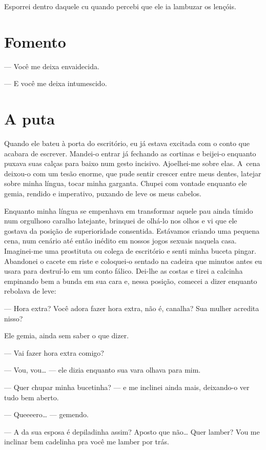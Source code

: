 Esporrei dentro daquele cu quando percebi que ele ia lambuzar os
lençóis.

\chapter{Fomento}

\mbox{}\indent{}--- Você me deixa envaidecida.

--- E você me deixa intumescido.

\chapter{A puta}

Quando ele bateu à porta do escritório, eu já estava excitada com o
conto que acabara de escrever. Mandei-o entrar já fechando as cortinas e
beijei-o enquanto puxava suas calças para baixo num gesto incisivo.
Ajoelhei-me sobre elas. A~cena deixou-o com um tesão enorme, que pude
sentir crescer entre meus dentes, latejar sobre minha língua, tocar
minha garganta. Chupei com vontade enquanto ele gemia, rendido e
imperativo, puxando de leve os meus cabelos.

Enquanto minha língua se empenhava em transformar aquele pau ainda
tímido num orgulhoso caralho latejante, brinquei de olhá-lo nos olhos e
vi que ele gostava da posição de superioridade consentida. Estávamos
criando uma pequena cena, num cenário até então inédito em nossos jogos
sexuais naquela casa. Imaginei-me uma prostituta ou colega de escritório
e senti minha buceta pingar. Abandonei o cacete em riste e coloquei-o
sentado na cadeira que minutos antes eu usara para destruí-lo em um
conto fálico. Dei-lhe as costas e tirei a calcinha empinando bem a bunda
em sua cara e, nessa posição, comecei a dizer enquanto rebolava de leve:

--- Hora extra? Você adora fazer hora extra, não é, canalha? Sua mulher
acredita nisso?

Ele gemia, ainda sem saber o que dizer.

--- Vai fazer hora extra comigo?

--- Vou, vou… --- ele dizia enquanto sua vara olhava para mim.

--- Quer chupar minha bucetinha? --- e me inclinei ainda mais,
deixando-o ver tudo bem aberto.

--- Queeeero… --- gemendo.

--- A da sua esposa é depiladinha assim? Aposto que não… Quer
lamber? Vou me inclinar bem cadelinha pra você me lamber por trás.

